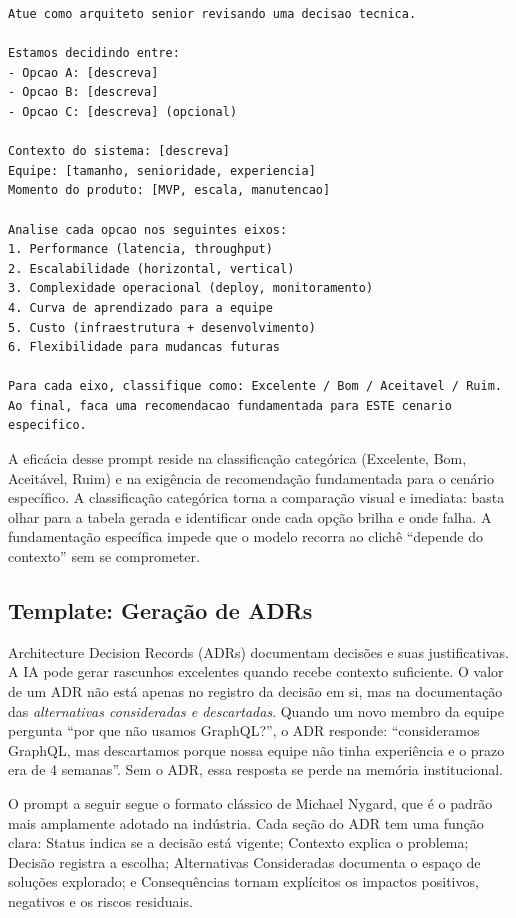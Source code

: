 \begin{lstlisting}[language={}, caption={Prompt para análise de trade-offs arquiteturais}]
Atue como arquiteto senior revisando uma decisao tecnica.

Estamos decidindo entre:
- Opcao A: [descreva]
- Opcao B: [descreva]
- Opcao C: [descreva] (opcional)

Contexto do sistema: [descreva]
Equipe: [tamanho, senioridade, experiencia]
Momento do produto: [MVP, escala, manutencao]

Analise cada opcao nos seguintes eixos:
1. Performance (latencia, throughput)
2. Escalabilidade (horizontal, vertical)
3. Complexidade operacional (deploy, monitoramento)
4. Curva de aprendizado para a equipe
5. Custo (infraestrutura + desenvolvimento)
6. Flexibilidade para mudancas futuras

Para cada eixo, classifique como: Excelente / Bom / Aceitavel / Ruim.
Ao final, faca uma recomendacao fundamentada para ESTE cenario especifico.
\end{lstlisting}

A eficácia desse prompt reside na classificação categórica (Excelente, Bom,
Aceitável, Ruim) e na exigência de recomendação fundamentada para o cenário
específico. A classificação categórica torna a comparação visual e imediata:
basta olhar para a tabela gerada e identificar onde cada opção brilha e onde
falha. A fundamentação específica impede que o modelo recorra ao clichê ``depende
do contexto'' sem se comprometer.

\subsection{Template: Geração de ADRs}

Architecture Decision Records (ADRs) documentam decisões e suas justificativas.
A IA pode gerar rascunhos excelentes quando recebe contexto suficiente. O valor
de um ADR não está apenas no registro da decisão em si, mas na documentação das
\textit{alternativas consideradas e descartadas}. Quando um novo membro da equipe
pergunta ``por que não usamos GraphQL?'', o ADR responde: ``consideramos GraphQL,
mas descartamos porque nossa equipe não tinha experiência e o prazo era de 4
semanas''. Sem o ADR, essa resposta se perde na memória institucional.

O prompt a seguir segue o formato clássico de Michael Nygard, que é o padrão
mais amplamente adotado na indústria. Cada seção do ADR tem uma função clara:
Status indica se a decisão está vigente; Contexto explica o problema; Decisão
registra a escolha; Alternativas Consideradas documenta o espaço de soluções
explorado; e Consequências tornam explícitos os impactos positivos, negativos e
os riscos residuais.

